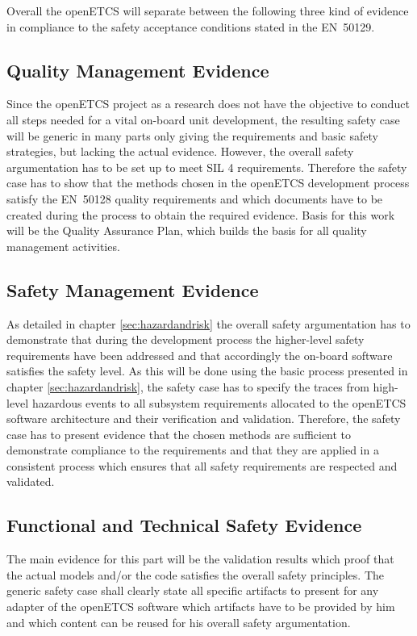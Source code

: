 \documentclass{template/openetcs_report}
\begin{document}
Overall the openETCS will separate between the following three kind of evidence in compliance to the safety acceptance conditions stated in the EN~50129. 

\subsection{Quality Management Evidence}

Since the openETCS project as a research does not have the objective to conduct all steps needed for a vital on-board unit development, the resulting safety case will be generic in many parts only giving the requirements and basic safety strategies, but lacking the actual evidence. However, the overall safety argumentation has to be set up to meet SIL 4 requirements. Therefore the safety case has to show that the methods chosen in the openETCS development process satisfy the EN~50128 quality requirements and which documents have to be created during the process to obtain the required evidence. Basis for this work will be the Quality Assurance Plan, which builds the basis for all quality management activities.

\subsection{Safety Management Evidence}

As detailed in chapter \ref{sec:hazardandrisk} the overall safety argumentation has to demonstrate that during the development process the higher-level safety requirements have been addressed and that accordingly the on-board software satisfies the safety level. As this will be done using the basic process presented in chapter \ref{sec:hazardandrisk}, the safety case has to specify the traces from high-level hazardous events to all subsystem requirements allocated to the openETCS software architecture and their verification and validation. Therefore, the safety case has to present evidence that the chosen methods are sufficient to demonstrate compliance to the requirements and that they are applied in a consistent process which ensures that all safety requirements are respected and validated.


\subsection{Functional and Technical Safety Evidence}

The main evidence for this part will be the validation results which proof that the actual models and/or the code satisfies the overall safety principles. The generic safety case shall clearly state all specific artifacts to present for any adapter of the openETCS software which artifacts have to be provided by him and which content can be reused for his overall safety argumentation.
\end{document}
